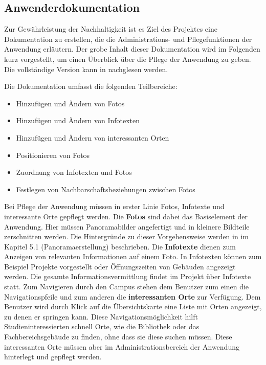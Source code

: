 \subsection{Anwenderdokumentation}
\label{sec:Anwenderdokumentation}

Zur Gewährleistung der Nachhaltigkeit ist es Ziel des Projektes eine
Dokumentation zu erstellen, die die Administrations- und Pflegefunktionen der
Anwendung erläutern. Der grobe Inhalt dieser Dokumentation wird im Folgenden
kurz vorgestellt, um einen Überblick über die Pflege der Anwendung zu geben. Die
vollständige Version kann in \citet{projektdokumentation2014} nachglesen werden.

Die Dokumentation umfasst die folgenden Teilbereiche:

\begin{itemize}
  \item Hinzufügen und Ändern von Fotos
  \item Hinzufügen und Ändern von Infotexten
  \item Hinzufügen und Ändern von interessanten Orten
  \item Positionieren von Fotos
  \item Zuordnung von Infotexten und Fotos
  \item Festlegen von Nachbarschaftsbeziehungen zwischen Fotos
\end{itemize}

Bei Pflege der Anwendung müssen in erster Linie Fotos, Infotexte und interessante Orte gepflegt werden. Die \textbf{Fotos}
sind dabei das Basiselement der Anwendung. Hier müssen Panoramabilder angefertigt und in kleinere Bildteile zerschnitten
werden. Die Hintergründe zu dieser Vorgehensweise werden in \citet{modelierungUndBetrieb2014} im
Kapitel 5.1 (Panoramaerstellung) beschrieben.
Die \textbf{Infotexte} dienen zum Anzeigen von relevanten Informationen auf einem Foto. In Infotexten können
zum Beispiel Projekte vorgestellt oder Öffnungszeiten von Gebäuden angezeigt werden. Die gesamte Informationsvermittlung
findet im Projekt über Infotexte statt.
Zum Navigieren durch den Campus stehen dem Benutzer zum einen die Navigationspfeile und zum anderen die
\textbf{interessanten Orte} zur Verfügung. Dem Benutzer wird durch Klick auf die
Übersichtskarte eine Liste mit Orten angezeigt, zu denen er springen kann.
Diese Navigationsmöglichkeit hilft Studieninteressierten schnell Orte, wie die
Bibliothek oder das Fachbereichsgebäude zu finden, ohne dass sie diese suchen
müssen. Diese interessanten Orte müssen aber im Administrationsbereich der
Anwendung hinterlegt und gepflegt werden.

